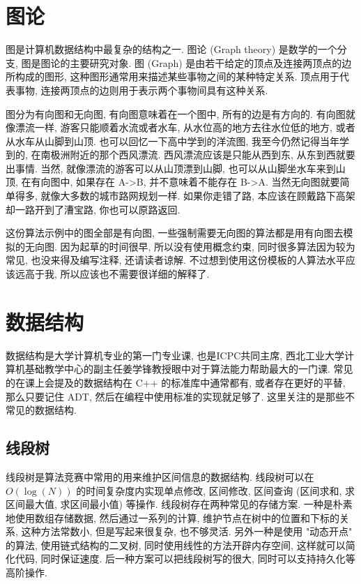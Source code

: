 \documentclass[a4paper]{ctexbook}
\begin{document}


\chapter{图论}

图是计算机数据结构中最复杂的结构之一. 图论 (Graph theory) 是数学的一个分支, 图是图论的主要研究对象. 图 (Graph) 是由若干给定的顶点及连接两顶点的边所构成的图形, 这种图形通常用来描述某些事物之间的某种特定关系. 顶点用于代表事物, 连接两顶点的边则用于表示两个事物间具有这种关系.

图分为有向图和无向图, 有向图意味着在一个图中, 所有的边是有方向的. 有向图就像漂流一样, 游客只能顺着水流或者水车, 从水位高的地方去往水位低的地方, 或者从水车从山脚到山顶. 也可以回忆一下高中学到的洋流图, 我至今仍然记得当年学到的, 在南极洲附近的那个西风漂流. 西风漂流应该是只能从西到东, 从东到西就要出事情. 当然, 就像漂流的游客可以从山顶漂到山脚, 也可以从山脚坐水车来到山顶, 在有向图中, 如果存在 A->B, 并不意味着不能存在 B->A. 当然无向图就要简单得多, 就像大多数的城市路网规划一样. 如果你走错了路, 本应该在顾戴路下高架却一路开到了漕宝路, 你也可以原路返回.

这份算法示例中的图全部是有向图, 一些强制需要无向图的算法都是用有向图去模拟的无向图. 因为起草的时间很早, 所以没有使用概念约束, 同时很多算法因为较为常见, 也没来得及编写注释, 还请读者谅解. 不过想到使用这份模板的人算法水平应该远高于我, 所以应该也不需要很详细的解释了.



\chapter{数据结构}

数据结构是大学计算机专业的第一门专业课, 也是ICPC共同主席, 西北工业大学计算机基础教学中心的副主任姜学锋教授眼中对于算法能力帮助最大的一门课. 常见的在课上会提及的数据结构在 C++ 的标准库中通常都有, 或者存在更好的平替, 那么只要记住 ADT, 然后在编程中使用标准的实现就足够了. 这里关注的是那些不常见的数据结构.

\section{线段树}

线段树是算法竞赛中常用的用来维护区间信息的数据结构. 线段树可以在 $O(\log(N))$ 的时间复杂度内实现单点修改, 区间修改, 区间查询 (区间求和, 求区间最大值, 求区间最小值) 等操作. 线段树存在两种常见的存储方案. 一种是朴素地使用数组存储数据, 然后通过一系列的计算, 维护节点在树中的位置和下标的关系, 这种方法常数小, 但是写起来很复杂, 也不够灵活. 另外一种是使用 "动态开点" 的算法, 使用链式结构的二叉树, 同时使用线性的方法开辟内存空间, 这样就可以简化代码, 同时保证速度. 后一种方案可以把线段树写的很大, 同时可以支持持久化等高阶操作.
\end{document}
